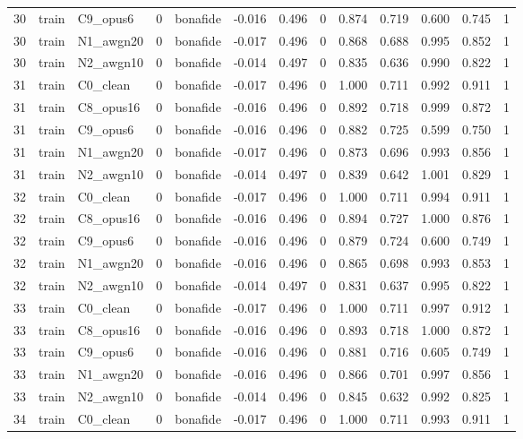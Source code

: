 \begin{tabular}{rllrlrrrrrrrr}
30 & train & C9_opus6 & 0 & bonafide & -0.016 & 0.496 & 0 & 0.874 & 0.719 & 0.600 & 0.745 & 1 \\
30 & train & N1_awgn20 & 0 & bonafide & -0.017 & 0.496 & 0 & 0.868 & 0.688 & 0.995 & 0.852 & 1 \\
30 & train & N2_awgn10 & 0 & bonafide & -0.014 & 0.497 & 0 & 0.835 & 0.636 & 0.990 & 0.822 & 1 \\
31 & train & C0_clean & 0 & bonafide & -0.017 & 0.496 & 0 & 1.000 & 0.711 & 0.992 & 0.911 & 1 \\
31 & train & C8_opus16 & 0 & bonafide & -0.016 & 0.496 & 0 & 0.892 & 0.718 & 0.999 & 0.872 & 1 \\
31 & train & C9_opus6 & 0 & bonafide & -0.016 & 0.496 & 0 & 0.882 & 0.725 & 0.599 & 0.750 & 1 \\
31 & train & N1_awgn20 & 0 & bonafide & -0.017 & 0.496 & 0 & 0.873 & 0.696 & 0.993 & 0.856 & 1 \\
31 & train & N2_awgn10 & 0 & bonafide & -0.014 & 0.497 & 0 & 0.839 & 0.642 & 1.001 & 0.829 & 1 \\
32 & train & C0_clean & 0 & bonafide & -0.017 & 0.496 & 0 & 1.000 & 0.711 & 0.994 & 0.911 & 1 \\
32 & train & C8_opus16 & 0 & bonafide & -0.016 & 0.496 & 0 & 0.894 & 0.727 & 1.000 & 0.876 & 1 \\
32 & train & C9_opus6 & 0 & bonafide & -0.016 & 0.496 & 0 & 0.879 & 0.724 & 0.600 & 0.749 & 1 \\
32 & train & N1_awgn20 & 0 & bonafide & -0.016 & 0.496 & 0 & 0.865 & 0.698 & 0.993 & 0.853 & 1 \\
32 & train & N2_awgn10 & 0 & bonafide & -0.014 & 0.497 & 0 & 0.831 & 0.637 & 0.995 & 0.822 & 1 \\
33 & train & C0_clean & 0 & bonafide & -0.017 & 0.496 & 0 & 1.000 & 0.711 & 0.997 & 0.912 & 1 \\
33 & train & C8_opus16 & 0 & bonafide & -0.016 & 0.496 & 0 & 0.893 & 0.718 & 1.000 & 0.872 & 1 \\
33 & train & C9_opus6 & 0 & bonafide & -0.016 & 0.496 & 0 & 0.881 & 0.716 & 0.605 & 0.749 & 1 \\
33 & train & N1_awgn20 & 0 & bonafide & -0.016 & 0.496 & 0 & 0.866 & 0.701 & 0.997 & 0.856 & 1 \\
33 & train & N2_awgn10 & 0 & bonafide & -0.014 & 0.496 & 0 & 0.845 & 0.632 & 0.992 & 0.825 & 1 \\
34 & train & C0_clean & 0 & bonafide & -0.017 & 0.496 & 0 & 1.000 & 0.711 & 0.993 & 0.911 & 1 \\

\end{tabular}
